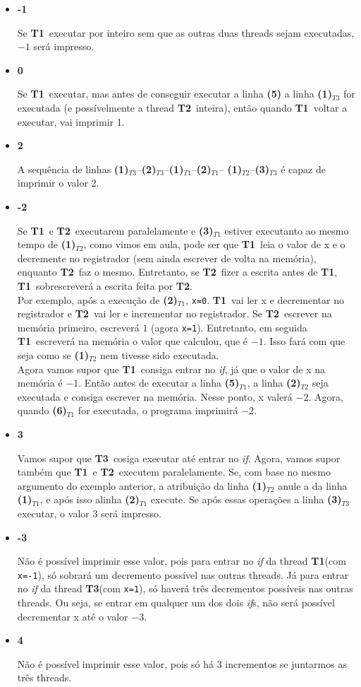 \documentclass{article}
\newcommand{\Tu}{\textbf{T1}}
\newcommand{\Td}{\textbf{T2}}
\newcommand{\Tt}{\textbf{T3}}
\newcommand{\TL}[2]{\textbf{(#1)}$_{T#2}$}
\begin{document}
\begin{itemize}
	\item \textbf{-1}\par
		Se \Tu\ executar por inteiro sem que as outras duas threads sejam executadas, $-1$ será impresso.
	\item \textbf{0}\par
		Se \Tu\ executar, mas antes de conseguir executar a linha \textbf{(5)} a linha \TL{1}{3}
		for executada (e possívelmente a thread \Td\ inteira), então quando \Tu\ voltar a executar, vai imprimir 1.
	\item \textbf{2}\par
		A sequência de linhas \TL{1}{3}--\TL{2}{3}--\TL{1}{1}--\TL{2}{1}--%
		\TL{1}{2}--\TL{3}{3} é capaz de imprimir o valor 2.
	\item \textbf{-2}\par
		Se \Tu\ e \Td\ executarem paralelamente e \TL{3}{1} estiver executanto ao mesmo tempo de \TL{1}{2},
		como vimos em aula, pode ser que \Tu\ leia o valor de x e o decremente no registrador (sem ainda escrever
		de volta na memória), enquanto \Td\ faz o mesmo. Entretanto, se \Td\ fizer a escrita antes de \Tu, \Tu\
		sobrescreverá a escrita feita por \Td.\\
		Por exemplo, após a execução de \TL{2}{1}, \texttt{x=0}. \Tu\ vai ler x e decrementar no registrador e
		\Td\ vai ler e incrementar no registrador. Se \Td\ escrever na memória primeiro, escreverá $1$ (agora \texttt{x=1}).
		Entretanto, em seguida \Tu\ escreverá na memória o valor que calculou, que é $-1$. Isso fará com que seja como se
		\TL{1}{2} nem tivesse sido executada.\\
		Agora vamos supor que \Tu\ consiga entrar no \emph{if}, já que o valor de x na memória é $-1$. Então antes de executar
		a linha \TL{5}{1}, a linha \TL{2}{2} seja executada e consiga escrever na memória. Nesse ponto, x valerá $-2$. Agora,
		quando \TL{6}{1} for executada, o programa imprimirá $-2$.
	\item \textbf{3}\par
		Vamos supor que \Tt\ cosiga executar até entrar no \emph{if}. Agora, vamos supor também que \Tu\ e \Td\ executem
		paralelamente. Se, com base no mesmo argumento do exemplo anterior, a atribuição da linha \TL{1}{2} anule a da linha
		\TL{1}{1}, e após isso alinha \TL{2}{1} execute. Se após essas operações a linha \TL{3}{3} executar, o valor 3 será
		impresso.
	\item \textbf{-3}\par
		Não é possível imprimir esse valor, pois para entrar no \emph{if} da thread \Tu (com \texttt{x=-1}), só sobrará um
		decremento possível nas outras threads. Já para entrar no \emph{if} da thread \Tt (com \texttt{x=1}), só haverá três
		decrementos possíveis nas outras threads. Ou seja, se entrar em qualquer um dos dois \emph{if}s, não será possível
		decrementar x até o valor $-3$.
	\item \textbf{4}\par
		Não é possível imprimir esse valor, pois só há 3 incrementos se juntarmos as três threads.
\end{itemize}
\end{document}
